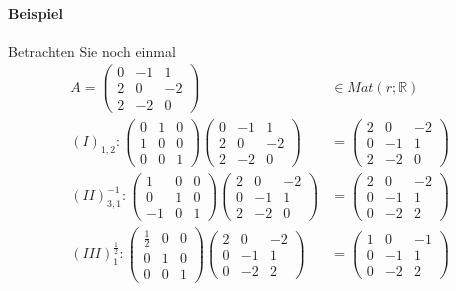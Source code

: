 \documentclass[11pt]{report}
\newcommand*\Zb[1] {\mathbb{#1}}
\begin{document}
\paragraph{Beispiel}
Betrachten Sie noch einmal
\begin{align}
A = \begin{pmatrix} 0 & -1 & 1 \\ 2 & 0 & -2 \\ 2 & -2 & 0 \end{pmatrix} &\in Mat(r;\Zb{R})\\
(I)_{1,2}: \begin{pmatrix} 0 & 1 & 0 \\ 1 & 0 & 0 \\ 0 & 0 & 1 \end{pmatrix} \begin{pmatrix} 0 & -1 & 1 \\ 2 & 0 & -2 \\ 2 & -2 & 0 \end{pmatrix} &= 
\begin{pmatrix} 2 & 0 & -2 \\ 0 & -1 & 1 \\ 2 & -2 & 0 \end{pmatrix} \\
(II)^{-1}_{3,1}: \begin{pmatrix} 1 & 0 & 0 \\ 0 & 1 & 0 \\ -1 & 0 & 1 \end{pmatrix}\begin{pmatrix} 2 & 0 & -2 \\ 0 & -1 & 1 \\ 2 & -2 & 0 \end{pmatrix} &= 
\begin{pmatrix} 2 & 0 & -2 \\ 0 & -1 & 1 \\ 0 & -2 & 2 \end{pmatrix} \\
(III)^{\frac{1}{2}}_{1}: \begin{pmatrix} \frac{1}{2} & 0 & 0 \\ 0 & 1 & 0 \\ 0 & 0 & 1 \end{pmatrix}\begin{pmatrix} 2 & 0 & -2 \\ 0 & -1 & 1 \\ 0 & -2 & 2 \end{pmatrix} &= \begin{pmatrix} 1 & 0 & -1 \\ 0 & -1 & 1 \\ 0 & -2 & 2 \end{pmatrix} \\

\end{align}
\end{document}
